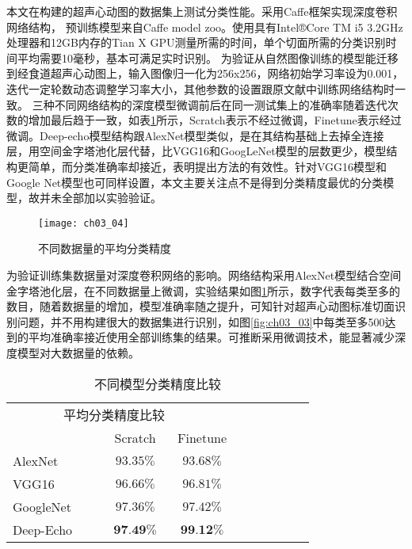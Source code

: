 	本文在构建的超声心动图的数据集上测试分类性能。采用Caffe框架\citep{Jia2014}实现深度卷积网络结构， 预训练模型来自Caffe model zoo。使用具有Intel®Core TM i5 3.2GHz处理器和12GB内存的Tian X GPU测量所需的时间，单个切面所需的分类识别时间平均需要10毫秒，基本可满足实时识别。
为验证从自然图像训练的模型能迁移到经食道超声心动图上，输入图像归一化为256x256，网络初始学习率设为0.001，迭代一定轮数动态调整学习率大小，其他参数的设置跟原文献中训练网络结构时一致。 三种不同网络结构的深度模型微调前后在同一测试集上的准确率随着迭代次数的增加最后趋于一致，如表\ref{tab:ch03_01}所示，Scratch表示不经过微调，Finetune表示经过微调。Deep-echo模型结构跟AlexNet模型类似，是在其结构基础上去掉全连接层，用空间金字塔池化层代替，比VGG16和GoogLeNet模型的层数更少，模型结构更简单，而分类准确率却接近，表明提出方法的有效性。针对VGG16模型和Google Net模型也可同样设置，本文主要关注点不是得到分类精度最优的分类模型，故并未全部加以实验验证。
\begin{figure}[!htbp]
\centering
\texttt{[image: ch03\_04]}
\caption{不同数据量的平均分类精度}
\label{fig:ch03_04}
\end{figure} 
为验证训练集数据量对深度卷积网络的影响。网络结构采用AlexNet模型结合空间金字塔池化层，在不同数据量上微调，实验结果如图\ref{fig:ch03_04}所示，数字代表每类至多的数目，随着数据量的增加，模型准确率随之提升，可知针对超声心动图标准切面识别问题，并不用构建很大的数据集进行识别，如图\ref{fig:ch03_03}中每类至多500达到的平均准确率接近使用全部训练集的结果。可推断采用微调技术，能显著减少深度模型对大数据量的依赖。
\begin{table}[!htbp]
    \centering
    \footnotesize%
    \setlength{\tabcolsep}{4pt}%
    \renewcommand{\arraystretch}{1.2}%
    \begin{tabular}{lcccccccc}
        \hline\hline
          \multicolumn{2}{c}{\ \ \ \ \ \ \ \ 平均分类精度比较} \\
        \cline{2-3}%
           \qquad  & Scratch & Finetune \\
        \hline
        AlexNet & $93.35\%$ & $93.68\%$ \\
        \hline
        VGG16 & $96.66\%$ & $96.81\%$ \\
        \hline
        GoogleNet & $97.36\%$ & $97.42\%$ \\
        \hline
        Deep-Echo & $\textbf{97.49\%}$ & $\textbf{99.12\%}$ \\
        \hline\hline
    \end{tabular}
    \caption{不同模型分类精度比较}
    \label{tab:ch03_01}
\end{table}


